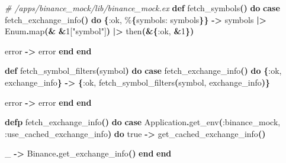 \documentclass[
  oneside]{book}
\newenvironment{Shaded}{\begin{snugshade}}{\end{snugshade}}
\newcommand{\CommentTok}[1]{\textcolor[rgb]{0.56,0.35,0.01}{\textit{#1}}}
\newcommand{\ConstantTok}[1]{\textcolor[rgb]{0.56,0.35,0.01}{#1}}
\newcommand{\DecValTok}[1]{\textcolor[rgb]{0.00,0.00,0.81}{#1}}
\newcommand{\FunctionTok}[1]{\textcolor[rgb]{0.13,0.29,0.53}{\textbf{#1}}}
\newcommand{\KeywordTok}[1]{\textcolor[rgb]{0.13,0.29,0.53}{\textbf{#1}}}
\newcommand{\NormalTok}[1]{#1}
\newcommand{\OperatorTok}[1]{\textcolor[rgb]{0.81,0.36,0.00}{\textbf{#1}}}
\newcommand{\OtherTok}[1]{\textcolor[rgb]{0.56,0.35,0.01}{#1}}
\newcommand{\StringTok}[1]{\textcolor[rgb]{0.31,0.60,0.02}{#1}}
\newcommand{\VariableTok}[1]{\textcolor[rgb]{0.00,0.00,0.00}{#1}}
\begin{document}
\begin{Shaded}
\begin{Highlighting}[]
  \CommentTok{\# /apps/binance\_mock/lib/binance\_mock.ex}
  \KeywordTok{def}\NormalTok{ fetch\_symbols}\FunctionTok{()} \KeywordTok{do}
    \KeywordTok{case}\NormalTok{ fetch\_exchange\_info}\FunctionTok{()} \KeywordTok{do}
      \FunctionTok{\{}\VariableTok{:ok}\NormalTok{, \%}\FunctionTok{\{}\VariableTok{symbols:}\NormalTok{ symbols}\FunctionTok{\}\}} \OperatorTok{{-}\textgreater{}}
\NormalTok{        symbols}
        \OperatorTok{|\textgreater{}} \ConstantTok{Enum}\OperatorTok{.}\NormalTok{map}\FunctionTok{(}\OperatorTok{\&} \OperatorTok{\&}\DecValTok{1}\OtherTok{[}\StringTok{"symbol"}\OtherTok{]}\FunctionTok{)}
        \OperatorTok{|\textgreater{}}\NormalTok{ then}\FunctionTok{(}\OperatorTok{\&}\FunctionTok{\{}\VariableTok{:ok}\NormalTok{, }\OperatorTok{\&}\DecValTok{1}\FunctionTok{\})}

\NormalTok{      error }\OperatorTok{{-}\textgreater{}}
\NormalTok{        error}
    \KeywordTok{end}
  \KeywordTok{end}

  \KeywordTok{def}\NormalTok{ fetch\_symbol\_filters}\FunctionTok{(}\NormalTok{symbol}\FunctionTok{)} \KeywordTok{do}
    \KeywordTok{case}\NormalTok{ fetch\_exchange\_info}\FunctionTok{()} \KeywordTok{do}
      \FunctionTok{\{}\VariableTok{:ok}\NormalTok{, exchange\_info}\FunctionTok{\}} \OperatorTok{{-}\textgreater{}}
        \FunctionTok{\{}\VariableTok{:ok}\NormalTok{, fetch\_symbol\_filters}\FunctionTok{(}\NormalTok{symbol, exchange\_info}\FunctionTok{)\}}

\NormalTok{      error }\OperatorTok{{-}\textgreater{}}
\NormalTok{        error}
    \KeywordTok{end}
  \KeywordTok{end}

  \KeywordTok{defp}\NormalTok{ fetch\_exchange\_info}\FunctionTok{()} \KeywordTok{do}
    \KeywordTok{case} \ConstantTok{Application}\OperatorTok{.}\NormalTok{get\_env}\FunctionTok{(}\VariableTok{:binance\_mock}\NormalTok{, }\VariableTok{:use\_cached\_exchange\_info}\FunctionTok{)} \KeywordTok{do}
      \ConstantTok{true} \OperatorTok{{-}\textgreater{}}
\NormalTok{        get\_cached\_exchange\_info}\FunctionTok{()}

\NormalTok{      \_ }\OperatorTok{{-}\textgreater{}}
        \ConstantTok{Binance}\OperatorTok{.}\NormalTok{get\_exchange\_info}\FunctionTok{()}
    \KeywordTok{end}
  \KeywordTok{end}


\end{Highlighting}
\end{Shaded}
\end{document}
